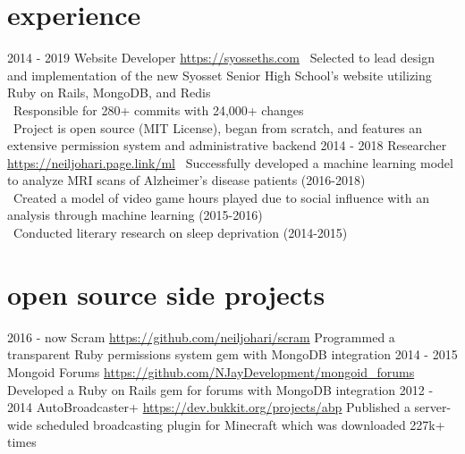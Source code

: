 \documentclass[]{friggeri-cv}
\begin{document}
\section{experience}
\begin{entrylist}
    \entry
    {2014 - 2019}
    {Website Developer}
    {\href{https://syosseths.com}{https://syosseths.com}}
    {\textendash \   Selected to lead design and implementation of the new Syosset Senior High School’s website utilizing Ruby on Rails, MongoDB, and Redis \\ 
     \textendash \   Responsible for 280+ commits with 24,000+ changes  \\
     \textendash \   Project is open source (MIT License), began from scratch, and features an extensive permission system and administrative backend}
    \entry
    {2014 - 2018}
    {Researcher}
    {\href{https://neiljohari.page.link/ml}{https://neiljohari.page.link/ml}}
    {\textendash \    Successfully developed a machine learning model to analyze MRI scans of Alzheimer’s disease patients (2016-2018) \\
     \textendash \    Created a model of video game hours played due to social influence with an analysis through machine learning (2015-2016) \\
     \textendash \    Conducted literary research on sleep deprivation (2014-2015)}
\end{entrylist} 

\section{open source side projects }
\begin{entrylist}
    \entry
    {2016 - now}
    {Scram}
    {\href{https://github.com/neiljohari/scram}{https://github.com/neiljohari/scram}}
    {Programmed a transparent Ruby permissions system gem with MongoDB integration}
    \entry
    {2014 - 2015}
    {Mongoid Forums}
    {\href{https://github.com/NJayDevelopment/mongoid_forums}{https://github.com/NJayDevelopment/mongoid\_forums}}
    {Developed a Ruby on Rails gem for forums with MongoDB integration}
    \entry
    {2012 - 2014}
    {AutoBroadcaster+}
    {\href{https://dev.bukkit.org/projects/abp}{https://dev.bukkit.org/projects/abp}}
    {Published a server-wide scheduled broadcasting plugin for Minecraft which was downloaded 227k+ times}

\end{entrylist}
\end{document}
